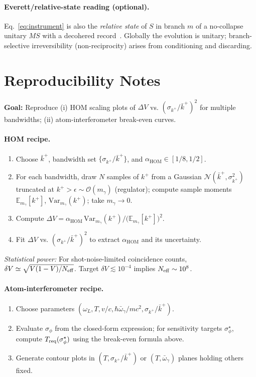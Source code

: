 \documentclass[aps,11pt]{article}
\newcommand{\Var}{\mathrm{Var}}
\newcommand{\E}{\mathbb{E}}
\newcommand{\kplus}{k^{+}}
\newcommand{\kbar}{\bar{k}^{+}}
\newcommand{\alphahom}{\alpha_{\text{HOM}}}
\begin{document}
\paragraph{Everett/relative-state reading (optional).}
Eq.~\eqref{eq:instrument} is also the \emph{relative state} of \(S\) in branch \(m\) of a no-collapse unitary \(MS\) with a decohered record~\cite{Everett1957,Zurek2003}. Globally the evolution is unitary; branch-selective irreversibility (non-reciprocity) arises from conditioning and discarding.

\section{Reproducibility Notes}\label{app:repro}
\textbf{Goal:} Reproduce (i) HOM scaling plots of \(\Delta V\) vs. \((\sigma_{\kplus}/\kbar)^{2}\) for multiple bandwidths; (ii) atom-interferometer break-even curves.

\paragraph{HOM recipe.}
\begin{enumerate}[leftmargin=1.25em]
\item Choose \(\kbar\), bandwidth set \(\{\sigma_{\kplus}/\kbar\}\), and \(\alphahom\in[1/8,1/2]\).
\item For each bandwidth, draw \(N\) samples of \(\kplus\) from a Gaussian \(\mathcal N(\kbar,\sigma_{\kplus}^{2})\) truncated at \(\kplus>\epsilon\sim \mathcal O(m_\gamma)\) (regulator); compute sample moments \(\E_{m_\gamma}[\kplus]\), \(\Var_{m_\gamma}(\kplus)\); take \(m_\gamma\to0\).
\item Compute \(\Delta V=\alphahom\,\Var_{m_\gamma}(\kplus)/\big(\E_{m_\gamma}[\kplus]\big)^{2}\).
\item Fit \(\Delta V\) vs. \((\sigma_{\kplus}/\kbar)^{2}\) to extract \(\alphahom\) and its uncertainty.
\end{enumerate}
\emph{Statistical power:} For shot-noise-limited coincidence counts, \(\delta V\simeq \sqrt{V(1-V)/N_{\rm eff}}\). Target \(\delta V\lesssim 10^{-4}\) implies \(N_{\rm eff}\sim 10^{8}\).

\paragraph{Atom-interferometer recipe.}
\begin{enumerate}[leftmargin=1.25em]
\item Choose parameters \((\omega_L,T,v/c,\hbar\bar\omega_\gamma/mc^{2},\sigma_{\kplus}/\kbar)\).
\item Evaluate \(\sigma_\phi\) from the closed-form expression; for sensitivity targets \(\sigma_\phi^\star\), compute \(T_{\rm req}(\sigma_\phi^\star)\) using the break-even formula above.
\item Generate contour plots in \((T,\sigma_{\kplus}/\kbar)\) or \((T,\bar\omega_\gamma)\) planes holding others fixed.
\end{enumerate}
\end{document}
